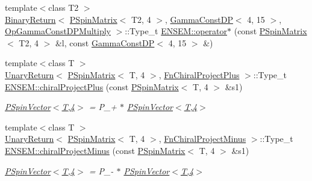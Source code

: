 \begin{DoxyCompactItemize}
\item 
{\footnotesize template$<$class T2 $>$ }\\\mbox{\hyperlink{structENSEM_1_1BinaryReturn}{Binary\+Return}}$<$ \mbox{\hyperlink{classENSEM_1_1PSpinMatrix}{P\+Spin\+Matrix}}$<$ T2, 4 $>$, \mbox{\hyperlink{classENSEM_1_1GammaConstDP}{Gamma\+Const\+DP}}$<$ 4, 15 $>$, \mbox{\hyperlink{structENSEM_1_1OpGammaConstDPMultiply}{Op\+Gamma\+Const\+D\+P\+Multiply}} $>$\+::Type\+\_\+t \mbox{\hyperlink{group__primspinmatrix_ga06378dd69a5d2daf15d11b69a3f42acd}{E\+N\+S\+E\+M\+::operator$\ast$}} (const \mbox{\hyperlink{classENSEM_1_1PSpinMatrix}{P\+Spin\+Matrix}}$<$ T2, 4 $>$ \&l, const \mbox{\hyperlink{classENSEM_1_1GammaConstDP}{Gamma\+Const\+DP}}$<$ 4, 15 $>$ \&)
\item 
{\footnotesize template$<$class T $>$ }\\\mbox{\hyperlink{structENSEM_1_1UnaryReturn}{Unary\+Return}}$<$ \mbox{\hyperlink{classENSEM_1_1PSpinMatrix}{P\+Spin\+Matrix}}$<$ T, 4 $>$, \mbox{\hyperlink{structENSEM_1_1FnChiralProjectPlus}{Fn\+Chiral\+Project\+Plus}} $>$\+::Type\+\_\+t \mbox{\hyperlink{group__primspinmatrix_ga6005e8f3442735f70e74a218c3d5a141}{E\+N\+S\+E\+M\+::chiral\+Project\+Plus}} (const \mbox{\hyperlink{classENSEM_1_1PSpinMatrix}{P\+Spin\+Matrix}}$<$ T, 4 $>$ \&s1)
\begin{DoxyCompactList}\small\item\em \mbox{\hyperlink{classENSEM_1_1PSpinVector_3_01T_00_014_01_4}{P\+Spin\+Vector$<$\+T,4$>$}} = P\+\_\++ $\ast$ \mbox{\hyperlink{classENSEM_1_1PSpinVector_3_01T_00_014_01_4}{P\+Spin\+Vector$<$\+T,4$>$}} \end{DoxyCompactList}\item 
{\footnotesize template$<$class T $>$ }\\\mbox{\hyperlink{structENSEM_1_1UnaryReturn}{Unary\+Return}}$<$ \mbox{\hyperlink{classENSEM_1_1PSpinMatrix}{P\+Spin\+Matrix}}$<$ T, 4 $>$, \mbox{\hyperlink{structENSEM_1_1FnChiralProjectMinus}{Fn\+Chiral\+Project\+Minus}} $>$\+::Type\+\_\+t \mbox{\hyperlink{group__primspinmatrix_ga6f9b4b2c70376b17548850f503a8c393}{E\+N\+S\+E\+M\+::chiral\+Project\+Minus}} (const \mbox{\hyperlink{classENSEM_1_1PSpinMatrix}{P\+Spin\+Matrix}}$<$ T, 4 $>$ \&s1)
\begin{DoxyCompactList}\small\item\em \mbox{\hyperlink{classENSEM_1_1PSpinVector_3_01T_00_014_01_4}{P\+Spin\+Vector$<$\+T,4$>$}} = P\+\_\+-\/ $\ast$ \mbox{\hyperlink{classENSEM_1_1PSpinVector_3_01T_00_014_01_4}{P\+Spin\+Vector$<$\+T,4$>$}} \end{DoxyCompactList}\end{DoxyCompactItemize}


